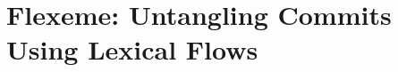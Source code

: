 \chapter{Flexeme: Untangling Commits Using Lexical Flows}
\label{chapter:flexeme}

\newcommand{\deltaPDG}{$\delta$-PDG\xspace}
\newcommand{\deltaPDGnCV}{$\delta$-PDG+CV\xspace}
\newcommand{\deltaPDGs}{$\delta$-PDGs\xspace}
\newcommand{\deltaPDGN}{$\delta$-NFG\xspace}
\newcommand{\deltaPDGNs}{$\delta$-NFGs\xspace}
\renewcommand{\algorithmicrequire}{\textbf{Input:}}
\renewcommand{\algorithmicensure}{\textbf{Output:}}


\newcommand{\ourapproach}{\textsc{flexeme}\xspace}
\newcommand{\Ourapproach}{\textsc{Flexeme}\xspace}
\renewcommand{\ourtool}{\textsc{heddle}\xspace}
\renewcommand{\Ourtool}{\textsc{Heddle}\xspace}
\newcommand{\projURL}{\url{https://github.com/PPPI/Flexeme}\xspace}

\newcommand{\Ouraccuracy}{$0.81$\xspace}
\newcommand{\Ouraccuracyhigh}{$0.84$\xspace}
\newcommand{\OuraccuracyhighProject}{Nancy\xspace}
\newcommand{\Ourspeedup}{$32$\xspace}
\newcommand{\OurslowdownBarnett}{$9$\xspace}
\newcommand{\Ourabsolutespeedup}{$3'10''$\xspace}
\newcommand{\Ourruntime}{ten seconds\xspace}
\newcommand{\OurtoolsAtomicAccuracy}{$0.63$\xspace}
\newcommand{\OurtoolsAtomicLabelAccuracy}{$0.93$\xspace}

\newcommand{\OurtoolVsHerzigAccuracy}{$0.14$\xspace}
\newcommand{\BarnettAccuracy}{$0.13$\xspace}
\newcommand{\HerzigConceptAccuracyDrop}{$0.07$\xspace}

\newcommand{\OurtoolsScalabilityRegression}{$t = 0.3371 - 0.0041 n + 0.0015 n^2$, $R^2=1.00$\xspace}
\newcommand{\HerzigScalabilityRegression}{$t = 0.8794 - 0.0528 n + 0.0019 n^2$, $R^2=0.99$\xspace}
\newcommand{\SpeedGainAtScale}{$68$ seconds\xspace}

\newcommand{\HerzigDeltaOurtoolAccuracy}{$p<0.001$\xspace}
\newcommand{\HerzigDeltaOurtoolTime}{$p=0.51$\xspace}
\newcommand{\BarnettConceptsAccuracy}{$p < 0.01$\xspace}
\newcommand{\HerzigConceptsAccuracy}{$p=0.28$\xspace}
\newcommand{\OurtoolConceptsAccuracy}{$p=0.76$\xspace}

\newcommand{\annequiv}{$\equiv_{a}$\xspace}
\newcommand{\nodeequiv}{$\equiv_{n}$\xspace}

\newcommand{\bra}{\langle}
\newcommand{\ket}{\rangle}

